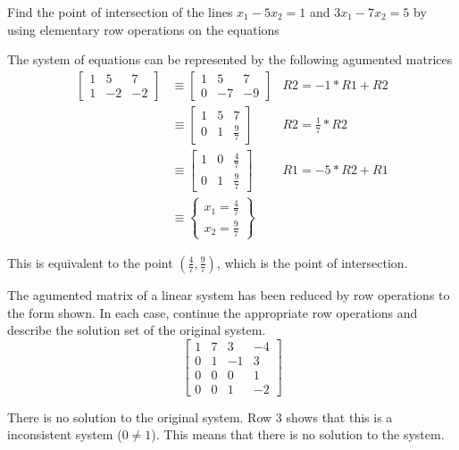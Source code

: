 \documentclass{mathhomework}
\begin{document}
\begin{problem}[1.1\#3]
    Find the point of intersection of the lines $x_1 - 5x_2 = 1$ and $3x_1 - 7x_2 = 5$ by using elementary row operations on the equations

    \begin{solution}
        The system of equations can be represented by the following agumented matrices
        \begin{align*}
            \begin{bmatrix}
                1 & 5 & 7 \\
                1 & -2 & -2
            \end{bmatrix}
            & \equiv
            \begin{bmatrix}
                1 & 5 & 7 \\
                0 & -7 & -9
            \end{bmatrix}
            & R2 = -1 * R1 + R2 \\ & \equiv
            \begin{bmatrix}
                1 & 5 & 7 \\
                0 & 1 & \frac{9}{7} 
            \end{bmatrix}
            & R2 = \frac{1}{7} * R2 \\ & \equiv
            \begin{bmatrix}
                1 & 0 & \frac{4}{7} \\
                0 & 1 & \frac{9}{7} 
            \end{bmatrix}
            & R1 = -5 * R2 + R1 \\ & \equiv
            \begin{Bmatrix}
                x_1 = \frac{4}{7} \\
                x_2 = \frac{9}{7}
            \end{Bmatrix}
        \end{align*}

        This is equivalent to the point $(\frac{4}{7}, \frac{9}{7})$, which is the point of intersection.
    \end{solution}
\end{problem}

\pagebreak
\begin{problem}[1.1\#7]
    The agumented matrix of a linear system has been reduced by row operations to the form shown.
    In each case, continue the appropriate row operations and describe the solution set of the original system.
    $$\begin{bmatrix}
        1 & 7 & 3 & -4 \\
        0 & 1 & -1 & 3 \\
        0 & 0 & 0 & 1 \\
        0 & 0 & 1 & -2
    \end{bmatrix}$$

    \begin{solution}
        There is no solution to the original system. Row 3 shows that this is a inconsistent system ($0 \neq 1$).
        This means that there is no solution to the system.
    \end{solution}
\end{problem}
\end{document}
